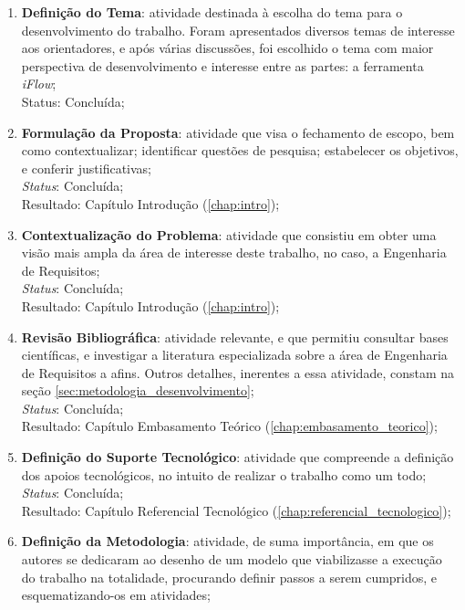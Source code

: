 \begin{enumerate}
    \item \textbf{Definição do Tema}: atividade destinada à escolha do tema para o desenvolvimento do trabalho. Foram apresentados diversos temas de interesse aos orientadores, e após várias discussões, foi escolhido o tema com maior perspectiva de desenvolvimento e interesse entre as partes: a ferramenta \textit{iFlow};
    \\
    Status: Concluída;
    \item \label{item:proposta} \textbf{Formulação da Proposta}: atividade que visa o fechamento de escopo, bem como contextualizar; identificar questões de pesquisa; estabelecer os objetivos, e conferir justificativas;
    \\
    \textit{Status}: Concluída;
    \\
    Resultado: Capítulo Introdução (\ref{chap:intro});
    \item \textbf{Contextualização do Problema}: atividade que consistiu em obter uma visão mais ampla da área de interesse deste trabalho, no caso, a Engenharia de Requisitos;
    \\
    \textit{Status}: Concluída;
    \\
    Resultado: Capítulo Introdução (\ref{chap:intro});
    \item \textbf{Revisão Bibliográfica}: atividade relevante, e que permitiu consultar bases científicas, e investigar a literatura especializada sobre a área de Engenharia de Requisitos a afins. Outros detalhes, inerentes a essa atividade, constam na seção \ref{sec:metodologia_desenvolvimento};
    \\
    \textit{Status}: Concluída;
    \\
    Resultado: Capítulo Embasamento Teórico (\ref{chap:embasamento_teorico});
    \item \textbf{Definição do Suporte Tecnológico}: atividade que compreende a definição dos apoios tecnológicos, no intuito de realizar o trabalho como um todo;
    \\
    \textit{Status}: Concluída;
    \\
    Resultado: Capítulo Referencial Tecnológico (\ref{chap:referencial_tecnologico});
    \item \textbf{Definição da Metodologia}: atividade, de suma importância, em que os autores se dedicaram ao desenho de um modelo que viabilizasse a execução do trabalho na totalidade, procurando definir passos a serem cumpridos, e esquematizando-os em atividades;
    \\

\end{enumerate}
